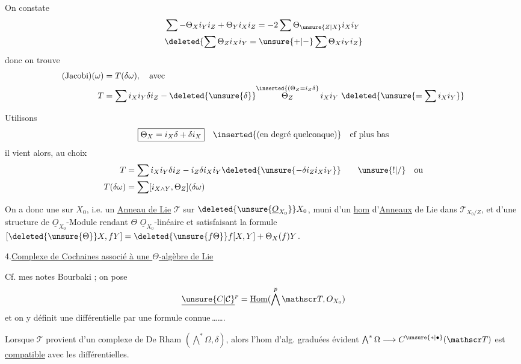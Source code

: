 On constate 
\[
\begin{aligned}
&\sum-\Theta_X i_Y i_Z+\Theta_Y i_X i_Z=-2\sum\Theta_{\unsure{Z|X}}i_X i_Y\\
&\deleted{\sum\Theta_Z i_X i_Y=\unsure{+|-}\sum\Theta_X i_Y i_Z}
\end{aligned}
\]
donc on trouve
\[
\begin{aligned}
(\text{Jacobi})(\omega)&=T(\delta\omega),\quad\text{avec}\\
T&=\sum i_X i_Y\delta i_Z-\deleted{\unsure{\delta}}\overset{\inserted{(\Theta_Z=i_Z\delta}}{\Theta_Z}\,i_X i_Y\ \deleted{\unsure{=\sum i_X i_Y}}
\end{aligned}
\]


Utilisons
\[
\boxed{\Theta_X=i_X\delta+\delta i_X}\quad\inserted{\text{(en degré quelconque)}}\quad\text{cf plus bas}
\]
il vient alors, au choix
\[
\begin{aligned}
T&=\sum i_X i_Y\delta i_Z-i_Z\delta i_X i_Y\deleted{\unsure{-\delta i_Z i_X i_Y}}\qquad \unsure{!|/}\quad\text{ou}\\
T(\delta\omega)&=\sum[i_{X\wedge Y},\Theta_Z](\delta\omega)
\end{aligned}
\]

On a donc une  sur $X_0$, i.e. un \uline{Anneau de Lie}  $\mathscr T$ sur $\deleted{\unsure{\underline O_{X_0}}}X_0$, muni d'un \uline{hom}  d'\uline{Anneaux} de Lie dans $\mathscr T_{X_0/Z}$, et d'une structure de $\underline O_{X_0}$-Module rendant $\Theta$ $\underline O_{X_0}$-linéaire et satisfaisant la formule $[\deleted{\unsure{\Theta}}X,fY]=\deleted{\unsure{f\Theta}}f[X,Y]+\Theta_X(f)Y$.

4.\quad \uline{Complexe de Cochaines associé à une $\Theta$-algèbre de Lie} 

Cf. mes notes Bourbaki ; on pose 
\[
\underline{\unsure{C|\mathcal C}}^p=\underline{\mathrm{Hom}}(\bigwedge^p\mathscr T,O_{X_0})
\]
et on y définit une différentielle par une formule connue\,\ldots\ldots.

Lorsque $\mathscr T$ provient d'un complexe de De Rham $(\bigwedge^*\Omega,\delta)$, alors l'hom d'alg. graduées évident $\bigwedge^*\Omega\longrightarrow C^{\unsure{*|\bullet}}(\mathscr T)$ est \uline{compatible} avec les  différentielles.

